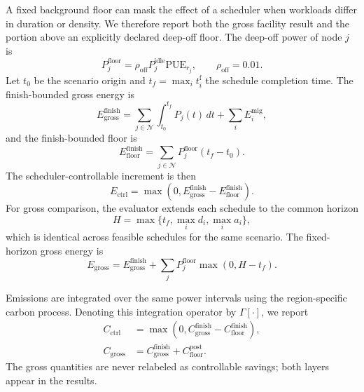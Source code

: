 \documentclass[preprint,12pt]{elsarticle}
\begin{document}
A fixed background floor can mask the effect of a scheduler when workloads differ in duration or density. We therefore report both the gross facility result and the portion above an explicitly declared deep-off floor. The deep-off power of node $j$ is
\begin{equation}
P^{\mathrm{floor}}_j=\rho_{\mathrm{off}}P_j^{\mathrm{idle}}\mathrm{PUE}_{r_j}, \qquad \rho_{\mathrm{off}}=0.01.
\label{eq:floor-power}
\end{equation}
Let $t_0$ be the scenario origin and $t_f=\max_i t_i^{\mathrm{f}}$ the schedule completion time. The finish-bounded gross energy is
\begin{equation}
E^{\mathrm{finish}}_{\mathrm{gross}}
=\sum_{j\in\mathcal{N}}\int_{t_0}^{t_f}P_j(t)\,dt
+\sum_i E_i^{\mathrm{mig}},
\label{eq:finish-energy}
\end{equation}
and the finish-bounded floor is
\begin{equation}
E^{\mathrm{finish}}_{\mathrm{floor}}
=\sum_{j\in\mathcal{N}}P^{\mathrm{floor}}_j(t_f-t_0).
\end{equation}
The scheduler-controllable increment is then
\begin{equation}
E_{\mathrm{ctrl}}=\max\left(0,E^{\mathrm{finish}}_{\mathrm{gross}}-E^{\mathrm{finish}}_{\mathrm{floor}}\right).
\label{eq:controllable-energy}
\end{equation}
For gross comparison, the evaluator extends each schedule to the common horizon
\begin{equation}
H=\max\{t_f,\max_i d_i,\max_i a_i\},
\label{eq:fixed-horizon}
\end{equation}
which is identical across feasible schedules for the same scenario. The fixed-horizon gross energy is
\begin{equation}
E_{\mathrm{gross}}=E^{\mathrm{finish}}_{\mathrm{gross}}+
\sum_j P^{\mathrm{floor}}_j\max(0,H-t_f).
\label{eq:gross-energy}
\end{equation}

Emissions are integrated over the same power intervals using the region-specific carbon process. Denoting this integration operator by $\Gamma[\cdot]$, we report
\begin{align}
C_{\mathrm{ctrl}} &= \max\left(0,C^{\mathrm{finish}}_{\mathrm{gross}}-C^{\mathrm{finish}}_{\mathrm{floor}}\right), \\
C_{\mathrm{gross}} &= C^{\mathrm{finish}}_{\mathrm{gross}}+C^{\mathrm{post}}_{\mathrm{floor}}.
\label{eq:carbon-layers}
\end{align}
The gross quantities are never relabeled as controllable savings; both layers appear in the results.
\end{document}
